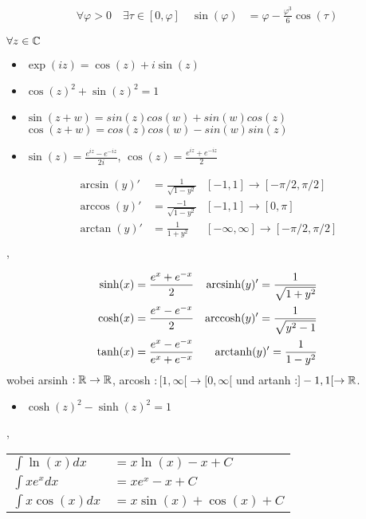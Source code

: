 \Korollar 
\begin{align*}
\forall \varphi > 0 \quad \exists \tau \in[0, \varphi] \quad \sin(\varphi) &= \varphi - \frac{\varphi^3}{6}\cos(\tau)
\end{align*}

\Satz $\forall z \in \mathbb{C}$ 
\begin{itemize}
	\item $\exp(iz) = \cos(z) + i\sin(z)$
	\item $\cos(z)^2 + \sin(z)^2 = 1$
	\item $\sin(z+w) = sin(z)cos(w) + sin(w)cos(z)$ \\
		  $\cos(z+w) = cos(z)cos(w) - sin(w)sin(z)$ 
	\item $\sin(z) = \frac{e^{iz}-e^{-iz}}{2i}$, $\cos(z) = \frac{e^{iz}+e^{-iz}}{2}$
\end{itemize}
\Lemma
\begin{align*}
\arcsin(y)'  &= \frac{1}{\sqrt{1-y^2}}  &[-1,1] \longrightarrow [-\pi/2, \pi/2]  \\
\arccos(y)'  &= \frac{-1}{\sqrt{1-y^2}}  &[-1,1] \longrightarrow [0, \pi]  \\
\arctan(y)'  &= \frac{1}{1+y^2}  &[-\infty,\infty] \longrightarrow [-\pi/2, \pi/2]  \\
\end{align*}
\sep

\begin{align*}
\sinh(x)  & =\frac{e^{x}+e^{-x}}{2} &\operatorname{arcsinh}(y)' = \frac{1}{\sqrt{1+y^2}}  \\
\cosh(x)  & =\frac{e^{x}-e^{-x}}{2} &\operatorname{arccosh}(y)' =  \frac{1}{\sqrt{y^2-1}} \\
\tanh(x)  & =\frac{e^{x}-e^{-x}}{e^{x}+e^{-x}} & \operatorname{arctanh}(y)' = \frac{1}{1-y^2}
\end{align*}
wobei arsinh $ : \mathbb{R} \rightarrow \mathbb{R}$, arcosh $ : [1,\infty[ \rightarrow [0,\infty[$ und artanh $: ]-1,1[ \rightarrow \mathbb{R}$.
\begin{itemize}
	\item $\cosh(z)^2 - \sinh(z)^2 = 1$
\end{itemize}
\sep

\begin{table}[H]
\centering
\begin{tabular}{p{3cm}p{4cm}}
$\int \ln(x) dx$ & $=x\ln(x)-x+C$
\\
$\int x e^x dx$ & $=x e^x-x+C$
\\
$\int x \cos(x) dx$ & $=x\sin(x)+\cos(x)+C$
\end{tabular}
\end{table}
